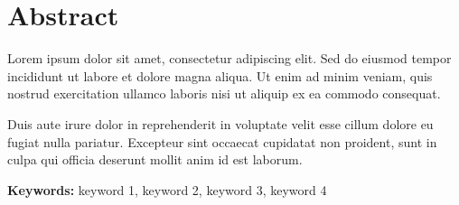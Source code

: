 \documentclass[../main.tex]{subfiles}
\begin{document}
\chapter*{Abstract}

Lorem ipsum dolor sit amet, consectetur adipiscing elit. Sed do eiusmod tempor incididunt ut labore et dolore magna aliqua. Ut enim ad minim veniam, quis nostrud exercitation ullamco laboris nisi ut aliquip ex ea commodo consequat.

Duis aute irure dolor in reprehenderit in voluptate velit esse cillum dolore eu fugiat nulla pariatur. Excepteur sint occaecat cupidatat non proident, sunt in culpa qui officia deserunt mollit anim id est laborum.

\vspace{1cm}

\noindent\textbf{Keywords:} keyword 1, keyword 2, keyword 3, keyword 4
\end{document}
